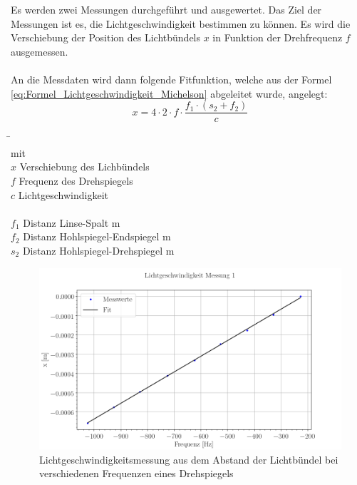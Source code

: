 Es werden zwei Messungen durchgeführt und ausgewertet. Das Ziel der Messungen ist es, die Lichtgeschwindigkeit bestimmen zu können. Es wird die Verschiebung der Position des Lichtbündels $x$ in Funktion der Drehfrequenz $f$ ausgemessen. \\
\\
An die Messdaten wird dann folgende Fitfunktion, welche aus der Formel \ref{eq:Formel_Lichtgeschwindigkeit_Michelson} abgeleitet wurde, angelegt:\\

\begin{equation}
x = 4\cdot 2 \cdot f \cdot \dfrac{f_{1} \cdot (s_{2}+f_{2})}{c}
\label{eq:Formel_Lichtgeschwindigkeit_Michelson_2}
\end{equation}

\begin{tabbing}
\hspace{10mm}			\=  \hspace{60mm} \=	\\
mit	\>					\\
$x$	\> Verschiebung des Lichbündels		\> 	[m]	\\
$f$	\> Frequenz des Drehspiegels		\>	[Hz]	\\
$c$	\> Lichtgeschwindigkeit			\> 	[m/s]	\\
\\
$f_1$	\> Distanz Linse-Spalt			 m	\\
$f_2$	\> Distanz Hohlspiegel-Endspiegel	 m \\
$s_2$	\> Distanz Hohlspiegel-Drehspiegel	 m \\
\end{tabbing}

\begin{figure}[h]
\includegraphics[width=\textwidth]{graphics/messung_1.png}
\caption{Lichtgeschwindigkeitsmessung aus dem Abstand der Lichtbündel bei verschiedenen Frequenzen eines Drehspiegels} %
\label{fig:pol1}
\end{figure}

